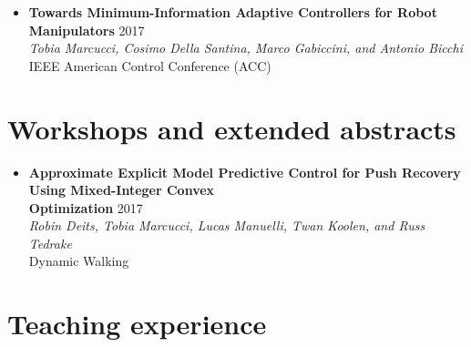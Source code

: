 \documentclass[11pt,a4paper,sans]{moderncv}
\begin{document}
\begin{itemize}
\item \textbf{Towards Minimum-Information Adaptive Controllers for Robot Manipulators} \hfill 2017 \\
\textit{Tobia Marcucci, Cosimo Della Santina, Marco Gabiccini, and Antonio Bicchi} \\
IEEE American Control Conference (ACC)

\end{itemize}

\section{Workshops and extended abstracts}

\vspace{5pt}

\begin{itemize}
	


\item \textbf{Approximate Explicit Model Predictive Control for Push Recovery Using Mixed-Integer Convex \\ Optimization} \hfill 2017 \\
\textit{Robin Deits, Tobia Marcucci, Lucas Manuelli, Twan Koolen, and Russ Tedrake} \\
Dynamic Walking

\end{itemize}

\section{Teaching experience}

\vspace{5pt}
\end{document}
